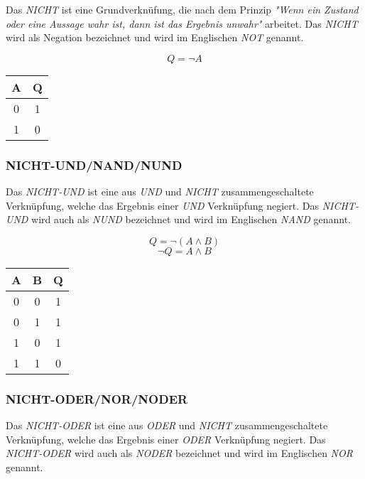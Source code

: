 \documentclass[a4paper, 12pt]{report}
\begin{document}
Das \emph{NICHT} ist eine Grundverknüfung, die nach dem Prinzip \emph{"Wenn ein
Zustand oder eine Aussage wahr ist, dann ist das Ergebnis unwahr"} arbeitet. 
Das \emph{NICHT} wird als Negation bezeichnet und wird im Englischen \emph{NOT}
genannt. 

\begin{center}
    \begin{equation}
        Q = \neg A
    \end{equation}
	\begin{tabular}{ | c || c | }
		\hline
		A & Q \\ \hline
		0 & 1 \\ \hline
		1 & 0 \\
		\hline
	\end{tabular}
\end{center}

\subsubsection{NICHT-UND/NAND/NUND}

Das \emph{NICHT-UND} ist eine aus \emph{UND} und \emph{NICHT} 
zusammengeschaltete Verknüpfung, welche das Ergebnis einer \emph{UND} 
Verknüpfung negiert. Das \emph{NICHT-UND} wird auch als \emph{NUND} 
bezeichnet und wird im Englischen \emph{NAND} genannt. 

\begin{center}
    \begin{equation}
        Q = \neg(A \land B)
    \end{equation}
    \begin{equation}
        \neg Q = A \land B
    \end{equation}
   \begin{tabular}{ | c | c || c | }
    	\hline
    	A & B & Q \\ \hline
    	0 & 0 & 1 \\ \hline
    	0 & 1 & 1 \\ \hline
    	1 & 0 & 1 \\ \hline
    	1 & 1 & 0 \\ 
    	\hline
    \end{tabular}
\end{center}

\subsubsection{NICHT-ODER/NOR/NODER}

Das \emph{NICHT-ODER} ist eine aus \emph{ODER} und \emph{NICHT} 
zusammengeschaltete Verknüpfung, welche das Ergebnis einer \emph{ODER} 
Verknüpfung negiert. Das \emph{NICHT-ODER} wird auch als \emph{NODER} 
bezeichnet und wird im Englischen \emph{NOR} genannt.
\end{document}
